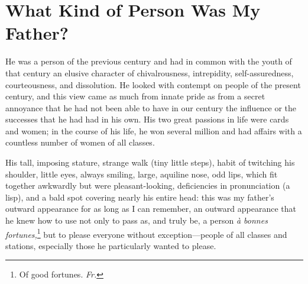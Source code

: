 \chapter{What Kind of Person Was My Father?} %

He was a person of the previous century and had in common with the youth of that century an elusive character of chivalrousness, intrepidity, self-assuredness, courteousness, and dissolution. He looked with contempt on people of the present century, and this view came as much from innate pride as from a secret annoyance that he had not been able to have in our century the influence or the successes that he had had in his own. His two great passions in life were cards and women; in the course of his life, he won several million and had affairs with a countless number of women of all classes.

His tall, imposing stature, strange walk (tiny little steps), habit of twitching his shoulder, little eyes, always smiling, large, aquiline nose, odd lips, which fit together awkwardly but were pleasant-looking, deficiencies in pronunciation (a lisp), and a bald spot covering nearly his entire head: this was my father's outward appearance for as long as I can remember, an outward appearance that he knew how to use not only to pass as, and truly be, a person \textit{\`a bonnes fortunes,}\footnote{Of good fortunes. \textit{Fr.}} but to please everyone without exception---people of all classes and stations, especially those he particularly wanted to please.

